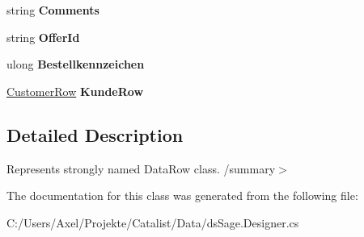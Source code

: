\begin{DoxyCompactItemize}
\item 
string {\bfseries Comments}\hypertarget{class_products_1_1_data_1_1ds_sage_1_1_offer_row_a9e934ba1185be86be27f34a5773bbd84}{}\label{class_products_1_1_data_1_1ds_sage_1_1_offer_row_a9e934ba1185be86be27f34a5773bbd84}

\item 
string {\bfseries Offer\+Id}\hypertarget{class_products_1_1_data_1_1ds_sage_1_1_offer_row_afb4f4906629e7fce138466247eba92d7}{}\label{class_products_1_1_data_1_1ds_sage_1_1_offer_row_afb4f4906629e7fce138466247eba92d7}

\item 
ulong {\bfseries Bestellkennzeichen}\hypertarget{class_products_1_1_data_1_1ds_sage_1_1_offer_row_a9236549a4b990a78a2400b3c1005126d}{}\label{class_products_1_1_data_1_1ds_sage_1_1_offer_row_a9236549a4b990a78a2400b3c1005126d}

\item 
\hyperlink{class_products_1_1_data_1_1ds_sage_1_1_customer_row}{Customer\+Row} {\bfseries Kunde\+Row}\hypertarget{class_products_1_1_data_1_1ds_sage_1_1_offer_row_aed06329f3eb791849e7b2a96eae2f2f2}{}\label{class_products_1_1_data_1_1ds_sage_1_1_offer_row_aed06329f3eb791849e7b2a96eae2f2f2}

\end{DoxyCompactItemize}


\subsection{Detailed Description}
Represents strongly named Data\+Row class. /summary$>$ 

The documentation for this class was generated from the following file\+:\begin{DoxyCompactItemize}
\item 
C\+:/\+Users/\+Axel/\+Projekte/\+Catalist/\+Data/ds\+Sage.\+Designer.\+cs\end{DoxyCompactItemize}
